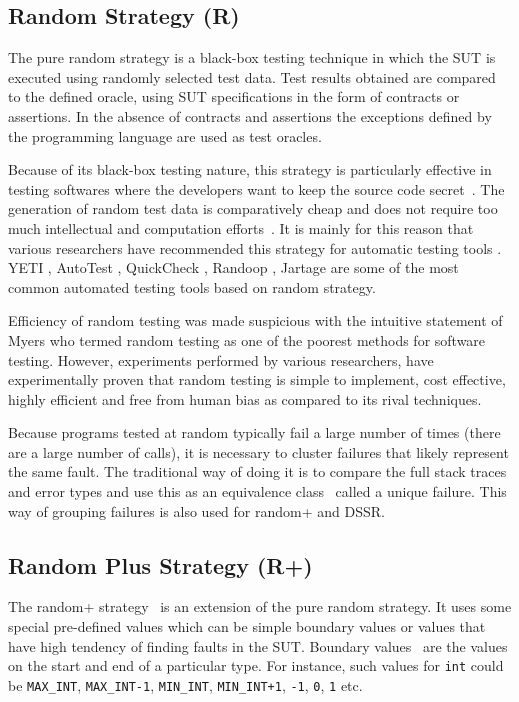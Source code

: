 \documentclass{acm_proc_article-sp}
\begin{document}
\subsection{Random Strategy (R)}
The pure random strategy is a black-box testing technique in which the SUT is executed using randomly selected test data. Test results obtained are compared to the defined oracle, using SUT specifications in the form of contracts or assertions. In the absence of contracts and assertions the exceptions defined by the programming language are used as test oracles. 

Because of its black-box testing nature, this strategy is particularly effective in testing softwares where the developers want to keep the source code secret~\cite{Chen2010}. The generation of random test data is comparatively cheap and does not require too much intellectual and computation efforts~\cite{Ciupa2009, Ciupa2008}. It is mainly for this reason that various researchers have recommended this strategy for automatic testing tools \cite{Ciupa2008a}. YETI \cite{Oriol2010a, Oriol2010}, AutoTest \cite{Leitner2007, Ciupa2007}, QuickCheck \cite{Claessen2000}, Randoop \cite{Pacheco2007}, Jartage \cite{Oriat2004} are some of the most common automated testing tools based on random strategy.

\indent Efficiency of random testing was made suspicious with the intuitive statement of Myers \cite{Myers2004} who termed random testing as one of the poorest methods for software testing. However, experiments performed by various researchers, \cite{Ciupa2007, Duran1981, Duran1984, Hamlet1994, Ntafos2001} have experimentally proven that random testing is simple to implement, cost effective, highly efficient and free from human bias as compared to its rival techniques.

Because programs tested at random typically fail a large number of times (there are a large number of calls), it is necessary to cluster failures that likely represent the same fault. The traditional way of doing it is to compare the full stack traces and error types and use this as an equivalence class~\cite{Ciupa2007,Oriol2012} called a unique failure. This way of grouping failures is also used for random+ and DSSR.

\subsection{Random Plus Strategy (R+)}
The random+ strategy~\cite{Leitner2007} is an extension of the pure random strategy. It uses some special pre-defined values which can be simple boundary values or values that have high tendency of finding faults in the SUT. Boundary values~\cite{Beizer1990} are the values on the start and end of a particular type. For instance, such values for \verb+int+ could be \verb+MAX_INT+, \verb+MAX_INT-1+, \verb+MIN_INT+, \verb-MIN_INT+1-, \verb+-1+, \verb+0+, \verb+1+ etc.
\end{document}
